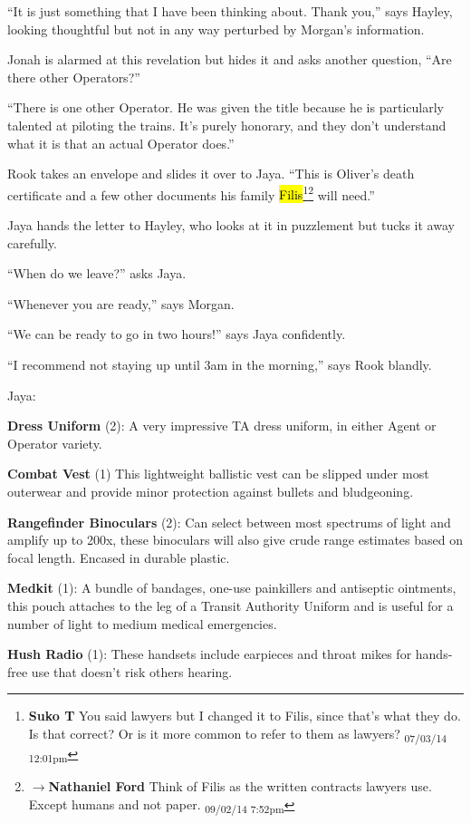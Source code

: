 ``It is just something that I have been thinking about.  Thank you,'' says Hayley, looking thoughtful but not in any way perturbed by Morgan's information.

Jonah is alarmed at this revelation but hides it and asks another question, ``Are there other Operators?''

``There is one other Operator.  He was given the title because he is particularly talented at piloting the trains.  It's purely honorary, and they don't understand what it is that an actual Operator does.''

Rook takes an envelope and slides it over to Jaya.  ``This is Oliver's death certificate and a few other documents his family \hl{Filis}\footnote{\textbf{Suko T }You said lawyers but I changed it to Filis, since that's what they do.  Is that correct?  Or is it more common to refer to them as lawyers? \textsubscript{07/03/14 12:01pm}}\footnote{$\rightarrow$\textbf{Nathaniel Ford }Think of Filis as the written contracts lawyers use. Except humans and not paper. \textsubscript{09/02/14 7:52pm}} will need.''

Jaya hands the letter to Hayley, who looks at it in puzzlement but tucks it away carefully.

``When do we leave?'' asks Jaya.

``Whenever you are ready,'' says Morgan.

``We can be ready to go in two hours!'' says Jaya confidently.

``I recommend not staying up until 3am in the morning,'' says Rook blandly.





Jaya:

{\parskip=0pt
\textbf{Dress Uniform} (2): A very impressive TA dress uniform, in either Agent or Operator variety.

\textbf{Combat Vest} (1) This lightweight ballistic vest can be slipped under most outerwear and provide minor protection against bullets and bludgeoning.

\textbf{Rangefinder Binoculars} (2): Can select between most spectrums of light and amplify up to 200x, these binoculars will also give crude range estimates based on focal length. Encased in durable plastic.

\textbf{Medkit} (1): A bundle of bandages, one-use painkillers and antiseptic ointments, this pouch attaches to the leg of a Transit Authority Uniform and is useful for a number of light to medium medical emergencies.

\textbf{Hush Radio} (1): These handsets include earpieces and throat mikes for hands-free use that doesn't risk others hearing.
}


